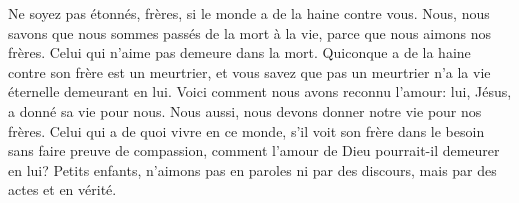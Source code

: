 Ne soyez pas étonnés, frères, si le monde a de la haine contre vous.
Nous, nous savons que nous sommes passés de la mort à la vie,
	parce que nous aimons nos frères.
	Celui qui n’aime pas demeure dans la mort.
Quiconque a de la haine contre son frère est un meurtrier,
	et vous savez que pas un meurtrier n’a la vie éternelle demeurant en lui.
Voici comment nous avons reconnu l’amour:
	lui, Jésus, a donné sa vie pour nous.
Nous aussi, nous devons donner notre vie pour nos frères.
Celui qui a de quoi vivre en ce monde,
	s’il voit son frère dans le besoin sans faire preuve de compassion,
	comment l’amour de Dieu pourrait-il demeurer en lui?
Petits enfants, n’aimons pas en paroles ni par des discours,
	mais par des actes et en vérité.

